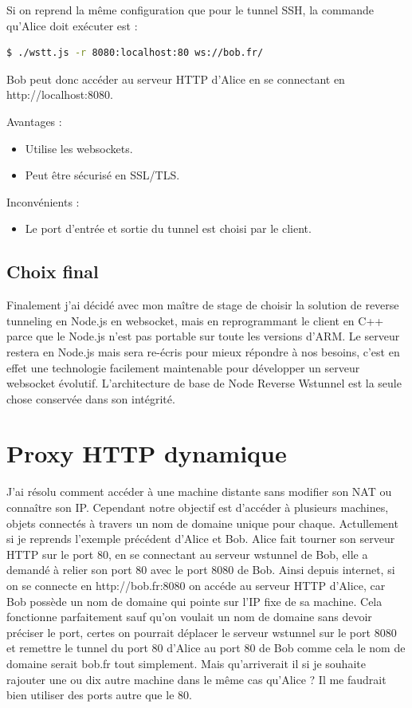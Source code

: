 Si on reprend la même configuration que pour le tunnel SSH, la commande qu'Alice doit exécuter est :
\begin{lstlisting}[language=bash]
  $ ./wstt.js -r 8080:localhost:80 ws://bob.fr/
\end{lstlisting}%

Bob peut donc accéder au serveur HTTP d'Alice en se connectant en http://localhost:8080.

Avantages :
\begin{itemize}
    \item Utilise les websockets.
    \item Peut être sécurisé en SSL/TLS.
\end{itemize}

Inconvénients :
\begin{itemize}
    \item Le port d'entrée et sortie du tunnel est choisi par le client.
\end{itemize}

\subsection{Choix final}

Finalement j'ai décidé avec mon maître de stage de choisir la solution de reverse tunneling en Node.js en websocket, mais en reprogrammant le client en C++ parce que le Node.js n'est pas portable sur toute les versions d'ARM. Le serveur restera en Node.js mais sera re-écris pour mieux répondre à nos besoins, c'est en effet une technologie facilement maintenable pour développer un serveur websocket évolutif. L'architecture de base de Node Reverse Wstunnel est la seule chose conservée dans son intégrité.

\section{Proxy HTTP dynamique}

J'ai résolu comment accéder à une machine distante sans modifier son NAT ou connaître son IP. Cependant notre objectif est d'accéder à plusieurs machines, objets connectés à travers un nom de domaine unique pour chaque. Actullement si je reprends l'exemple précédent d'Alice et Bob. Alice fait tourner son serveur HTTP sur le port 80, en se connectant au serveur wstunnel de Bob, elle a demandé à relier son port 80 avec le port 8080 de Bob. Ainsi depuis internet, si on se connecte en http://bob.fr:8080 on accéde au serveur HTTP d'Alice, car Bob possède un nom de domaine qui pointe sur l'IP fixe de sa machine. Cela fonctionne parfaitement sauf qu'on voulait un nom de domaine sans devoir préciser le port, certes on pourrait déplacer le serveur wstunnel sur le port 8080 et remettre le tunnel du port 80 d'Alice au port 80 de Bob comme cela le nom de domaine serait bob.fr tout simplement. Mais qu'arriverait il si je souhaite rajouter une ou dix autre machine dans le même cas qu'Alice ? Il me faudrait bien utiliser des ports autre que le 80.

